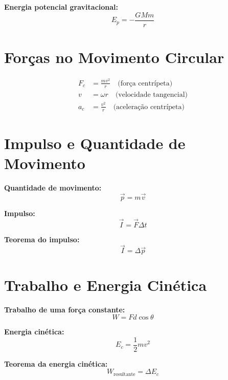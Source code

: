 \documentclass[a4paper,12pt]{article}
\begin{document}
\begin{multicols}{2}
\textbf{Energia potencial gravitacional:}
\begin{equation*}
  E_p = -\frac{G M m}{r}
\end{equation*}

\section{Forças no Movimento Circular}

\begin{align*}
  F_c &= \frac{m v^2}{r} \quad \text{(força centrípeta)} \\
  v &= \omega r \quad \text{(velocidade tangencial)} \\
  a_c &= \frac{v^2}{r} \quad \text{(aceleração centrípeta)}
\end{align*}

\section{Impulso e Quantidade de Movimento}

\textbf{Quantidade de movimento:}
\begin{equation*}
  \vec{p} = m \vec{v}
\end{equation*}

\textbf{Impulso:}
\begin{equation*}
  \vec{I} = \vec{F} \Delta t
\end{equation*}

\textbf{Teorema do impulso:}
\begin{equation*}
  \vec{I} = \Delta \vec{p}
\end{equation*}

\section{Trabalho e Energia Cinética}

\textbf{Trabalho de uma força constante:}
\begin{equation*}
  W = F d \cos \theta
\end{equation*}

\textbf{Energia cinética:}
\begin{equation*}
  E_c = \frac{1}{2} m v^2
\end{equation*}

\textbf{Teorema da energia cinética:}
\begin{equation*}
  W_{\text{resultante}} = \Delta E_c
\end{equation*}


\end{multicols}
\end{document}
